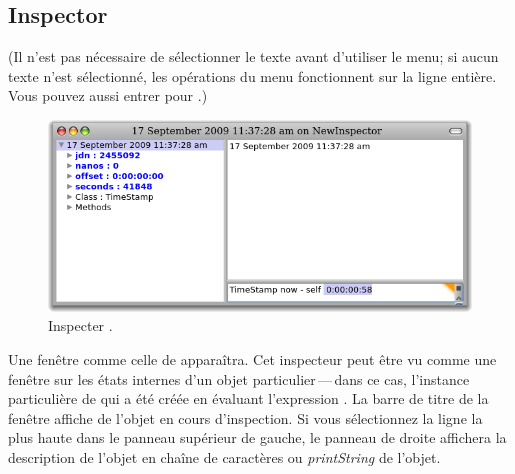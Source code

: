 \documentclass[a4paper,10pt,twoside]{book}
\begin{document}
\subsection{Inspector}

(Il n'est pas nécessaire de sélectionner le texte avant d'utiliser le menu;
si aucun texte n'est sélectionné, les opérations du menu fonctionnent
sur la ligne entière.
Vous pouvez aussi entrer  pour .)

\begin{figure}[btp]
	\begin{center}
		\includegraphics[width=\textwidth]{inspectTimeNow1}
	\end{center}
	\caption{Inspecter .}
\end{figure}

Une fenêtre comme celle de  apparaîtra.
Cet inspecteur peut être vu comme une fenêtre sur les états internes
d'un objet particulier\,---\,dans ce cas, l'instance particulière
de
 \mbox{} 
qui a été créée en évaluant l'expression 
.
La barre de titre de la fenêtre affiche   de l'objet
en cours d'inspection.
Si vous sélectionnez la ligne la plus haute dans le panneau supérieur de gauche,
le panneau de droite affichera la description de l'objet en chaîne de caractères ou \emph{printString} de l'objet.
\end{document}
